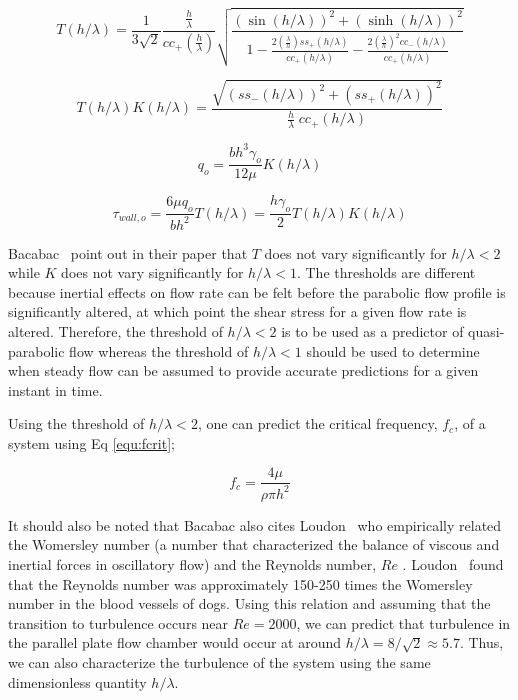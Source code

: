 \begin{equation}
T(h/\lambda) = \frac{1}{3\sqrt{2}}  \frac{\frac{h}{\lambda}}{cc_{+}(\frac{h}{\lambda})}   \sqrt{\frac{(\sin(h/\lambda))^{2}+(\sinh(h/\lambda))^{2}}{1-\frac{2(\frac{\lambda}{h})ss_{+}(h/\lambda)}{cc_{+}(h/\lambda)}-\frac{2(\frac{\lambda}{h})^{2}cc_{-}(h/\lambda)}{cc_{+}(h/\lambda)}}}
\label{equ:T}
\end{equation}

\begin{equation}
T(h/\lambda)K(h/\lambda) = \frac{\sqrt{\left(ss_{-}(h/\lambda)\right)^{2}+\left(ss_{+}(h/\lambda)\right)^{2}}}{\frac{h}{\lambda}\;cc_{+}(h/\lambda)}
\label{equ:TK}
\end{equation}

\begin{equation}
q_{o}=\frac{bh^{3}\gamma_{o}}{12\mu}K(h/\lambda)
\label{equ:q}
\end{equation}

\begin{equation}
\tau_{wall, o}=\frac{6\mu q_{o}}{bh^{2}}T(h/\lambda)=\frac{h\gamma_{o}}{2}T(h/\lambda)K(h/\lambda)
\label{equ:tau}
\end{equation}

Bacabac \etal\ point out in their paper that $T$ does not vary significantly for $h/\lambda<2$ while $K$ does not vary significantly for $h/\lambda<1$. The thresholds are different because inertial effects on flow rate can be felt before the parabolic flow profile is significantly altered, at which point the shear stress for a given flow rate is altered. Therefore, the threshold of $h/\lambda<2$ is to be used as a predictor of quasi-parabolic flow whereas the threshold of  $h/\lambda<1$ should be used to determine when steady flow can be assumed to provide accurate predictions for a given instant in time.

Using the threshold of $h/\lambda<2$, one can predict the critical frequency, $f_{c}$, of a system using Eq \ref{equ:fcrit};

\begin{equation}
f_{c} = \frac{4\mu}{\rho\pi h^{2}}
\label{equ:fcrit}
\end{equation}

It should also be noted that Bacabac also cites Loudon \etal\ who empirically related the Womersley number (a number that characterized the balance of viscous and inertial forces in oscillatory flow) and the Reynolds number, $Re$ \cite{Loudon:1998sf}. Loudon \etal\ found that the Reynolds number was approximately 150-250 times the Womersley number in the blood vessels of dogs. Using this relation and assuming that the transition to turbulence occurs near $Re=2000$, we can predict that turbulence in the parallel plate flow chamber would occur at around $h/\lambda=8/\sqrt{2}\approx5.7$. Thus, we can also characterize the turbulence of the system using the same dimensionless quantity $h/\lambda$.


